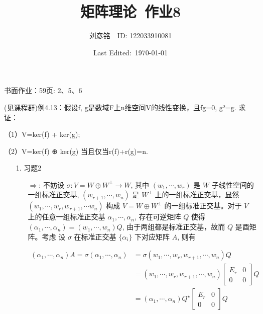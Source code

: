 \documentclass{article}
\title{矩阵理论\ 作业8}
\author{刘彦铭\ \ ID: 122033910081}
\date{Last Edited:\ \today}
\begin{document}
\maketitle

书面作业：59页: 2、5、6 

(见课程群)例4.13：假设f, g是数域F上n维空间V的线性变换，且fg=0, g²=g. 求证：

（1）V=ker(f) + ker(g); 

（2）V=ker(f) ⊕ ker(g) 当且仅当r(f)+r(g)=n.  

\begin{itemize}
    \item [1.] 习题2
    
    \begin{itemize}
        \item [$\Rightarrow$:] 不妨设 $\sigma: V = W \oplus W^\perp \to W$, 其中 $(w_1, \cdots, w_r)$ 是 $W$ 子线性空间的一组标准正交基, $(w_{r+1}, \cdots, w_{n})$ 是 $W^\perp$ 上的一组标准正交基，显然 $(w_1, \cdots, w_{r}, w_{r+1}, \cdots w_n)$ 构成 $V = W\oplus W^\perp$ 的一组标准正交基。对于 $V$ 上的任意一组标准正交基 $\alpha_1, \cdots, \alpha_n$, 存在可逆矩阵 $Q$ 使得 $(\alpha_1, \cdots, \alpha_n) = (w_1, \cdots, w_n) Q$, 由于两组都是标准正交基，故而 $Q$ 是酉矩阵。考虑 设 $\sigma$ 在标准正交基 $\{\alpha_i\}$ 下对应矩阵 $A$, 则有
        
        $\begin{array}{ll}(\alpha_1, \cdots, \alpha_n) A=\sigma (\alpha_1, \cdots, \alpha_n) &= \sigma(w_1, \cdots, w_r, w_{r+1}, \cdots, w_n) Q \\&= (w_1, \cdots, w_r, w_{r+1}, \cdots, w_n) \left[\begin{array}{cc}E_r&0\\0&0\end{array}\right]Q\\&=(\alpha_1, \cdots, \alpha_n)Q^\star \left[\begin{array}{cc}E_r&0\\0&0\end{array}\right]Q\end{array}$


\end{itemize}
\end{itemize}
\end{document}

